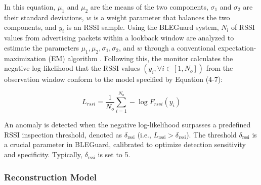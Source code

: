In this equation, $\mu_1$ and $\mu_2$ are the means of the two components, $\sigma_1$ and $\sigma_2$ are their standard deviations, $w$ is a weight parameter that balances the two components, and $y_i$ is an RSSI sample. Using the BLEGuard system, $N_l$ of RSSI values from advertising packets within a lookback window are analyzed to estimate the parameters $\mu_1, \mu_2, \sigma_1, \sigma_2$, and $w$ through a conventional expectation-maximization (EM) algorithm \cite{guo2018expectation}. Following this, the monitor calculates the negative log-likelihood that the RSSI values $\left(y_i, \forall i \in\left[1, N_o\right]\right)$ from the observation window conform to the model specified by Equation (4-7):

\vspace{-4pt}

\begin{equation}
\label{eq4-2}
L_{rssi}=\frac{1}{N_o} \sum_{i=1}^{N_o}-\log F_{rssi}\left(y_i\right)
\end{equation}


An anomaly is detected when the negative log-likelihood surpasses a predefined RSSI inspection threshold, denoted as $\delta_{\text{rssi}}$ (i.e., $L_{\text{rssi}} > \delta_{\text{rssi}}$). The threshold $\delta_{\text{rssi}}$ is a crucial parameter in BLEGuard, calibrated to optimize detection sensitivity and specificity. Typically, $\delta_{\text{rssi}}$ is set to 5.




\subsubsection{Reconstruction Model}


